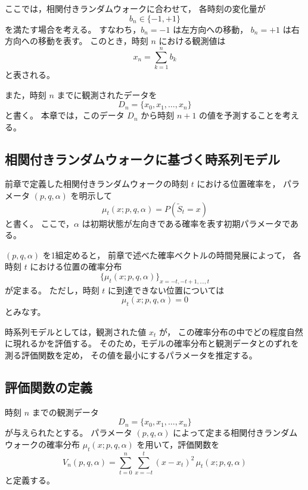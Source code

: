 \documentclass[a4j,dvipdfmx]{jsarticle}
\theoremstyle{plainnote}
\begin{document}
ここでは，相関付きランダムウォークに合わせて，
各時刻の変化量が
\begin{equation}
  b_n\in\{-1,+1\}
  \label{eq:model_bn_pm}
\end{equation}
を満たす場合を考える。
すなわち，$b_n=-1$ は左方向への移動，
$b_n=+1$ は右方向への移動を表す。
このとき，時刻 $n$ における観測値は
\begin{equation}
  x_n=\sum_{k=1}^{n} b_k
  \label{eq:model_xn}
\end{equation}
と表される。

また，時刻 $n$ までに観測されたデータを
\begin{equation}
  D_n=\{x_0,x_1,\ldots,x_n\}
  \label{eq:model_Dn}
\end{equation}
と書く。
本章では，このデータ $D_n$ から時刻 $n+1$ の値を予測することを考える。

\subsection{相関付きランダムウォークに基づく時系列モデル}

前章で定義した相関付きランダムウォークの時刻 $t$ における位置確率を，
パラメータ $(p,q,\alpha)$ を明示して
\begin{equation}
  \mu_t(x;p,q,\alpha)
  =
  P(\tilde{S}_t=x)
  \label{eq:model_mu}
\end{equation}
と書く。
ここで，$\alpha$ は初期状態が左向きである確率を表す初期パラメータである。

$(p,q,\alpha)$ を1組定めると，
前章で述べた確率ベクトルの時間発展によって，
各時刻 $t$ における位置の確率分布
\[
  \{\mu_t(x;p,q,\alpha)\}_{x=-t,-t+1,\ldots,t}
\]
が定まる。
ただし，時刻 $t$ に到達できない位置については
\[
  \mu_t(x;p,q,\alpha)=0
\]
とみなす。

時系列モデルとしては，観測された値 $x_t$ が，
この確率分布の中でどの程度自然に現れるかを評価する。
そのため，モデルの確率分布と観測データとのずれを測る評価関数を定め，
その値を最小にするパラメータを推定する。

\subsection{評価関数の定義}

時刻 $n$ までの観測データ
\[
  D_n=\{x_0,x_1,\ldots,x_n\}
\]
が与えられたとする。
パラメータ $(p,q,\alpha)$ によって定まる相関付きランダムウォークの確率分布
$\mu_t(x;p,q,\alpha)$ を用いて，評価関数を
\begin{equation}
  V_n(p,q,\alpha)
  =
  \sum_{t=0}^{n}
  \sum_{x=-t}^{t}
  (x-x_t)^2\,
  \mu_t(x;p,q,\alpha)
  \label{eq:model_Vn}
\end{equation}
と定義する。
\end{document}
